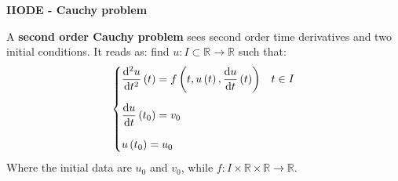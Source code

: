 \highspace
\begin{flushleft}
    \textcolor{Green3}{ \textbf{II\textdegree ODE - Cauchy problem}}
\end{flushleft}
A \textbf{second order Cauchy problem} sees second order time derivatives and two initial conditions. It reads as: find $u: I \subset \mathbb{R} \rightarrow \mathbb{R}$ such that:
\begin{equation}
    \begin{cases}
        \dfrac{\mathrm{d}^{2}u}{\mathrm{d}t^{2}}\left(t\right) = f\left(t, u\left(t\right), \dfrac{\mathrm{d}u}{\mathrm{d}t}\left(t\right)\right) & t \in I \vspace{1em} \\
        \dfrac{\mathrm{d}u}{\mathrm{d}t}\left(t_{0}\right) = v_{0} \vspace{1em} \\
        u\left(t_{0}\right) = u_{0}
    \end{cases}
\end{equation}
Where the initial data are $u_{0}$ and $v_{0}$, while $f: I \times \mathbb{R} \times \mathbb{R} \rightarrow \mathbb{R}$.